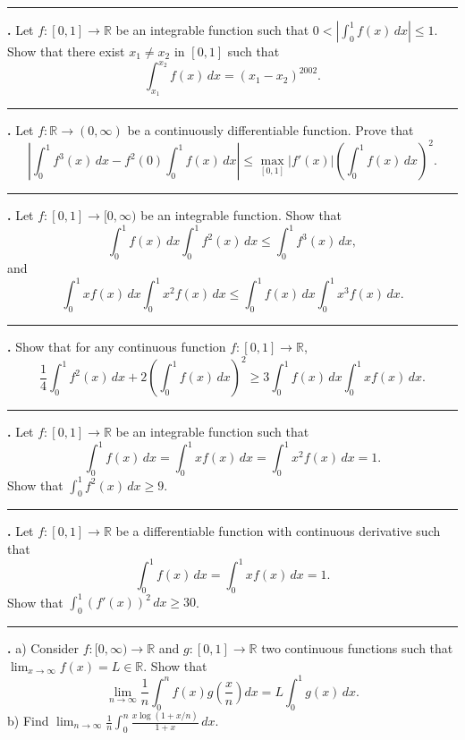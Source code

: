 \documentclass[11pt]{article}
\newcounter{probnum}
\newenvironment{problembox}{\par\noindent\rule{\linewidth}{0.5pt}\vspace{5pt}\par}{\vspace{2pt}}
\begin{document}
\begin{problembox}
\textbf{\theprobnum.} Let $f : [0,1] \to \mathbb{R}$ be an integrable function such that $0 < \left|\displaystyle\int_0^1 f(x)\,dx\right| \le 1$. Show that there exist $x_1 \ne x_2$ in $[0,1]$ such that
\[
\int_{x_1}^{x_2} f(x)\,dx = (x_1-x_2)^{2002}.
\]
\end{problembox}

\begin{problembox}
\textbf{\theprobnum.} Let $f : \mathbb{R} \to (0,\infty)$ be a continuously differentiable function. Prove that
\[
\left|\int_0^1 f^3(x)\,dx - f^2(0) \int_0^1 f(x)\,dx\right| \le \max_{[0,1]} |f'(x)| \left(\int_0^1 f(x)\,dx\right)^2.
\]
\end{problembox}

\begin{problembox}
\textbf{\theprobnum.} Let $f : [0,1] \to [0,\infty)$ be an integrable function. Show that
\[
\int_0^1 f(x)\,dx \int_0^1 f^2(x)\,dx \le \int_0^1 f^3(x)\,dx,
\]
and
\[
\int_0^1 x f(x)\,dx \int_0^1 x^2 f(x)\,dx \le \int_0^1 f(x)\,dx \int_0^1 x^3 f(x)\,dx.
\]
\end{problembox}

\begin{problembox}
\textbf{\theprobnum.} Show that for any continuous function $f : [0,1] \to \mathbb{R}$,
\[
\frac{1}{4} \int_0^1 f^2(x)\,dx + 2 \left(\int_0^1 f(x)\,dx\right)^2 \ge 3 \int_0^1 f(x)\,dx \int_0^1 x f(x)\,dx.
\]
\end{problembox}

\begin{problembox}
\textbf{\theprobnum.} Let $f : [0,1] \to \mathbb{R}$ be an integrable function such that
\[
\int_0^1 f(x)\,dx = \int_0^1 x f(x)\,dx = \int_0^1 x^2 f(x)\,dx = 1.
\]
Show that $\displaystyle\int_0^1 f^2(x)\,dx \ge 9$.
\end{problembox}

\begin{problembox}
\textbf{\theprobnum.} Let $f : [0,1] \to \mathbb{R}$ be a differentiable function with continuous derivative such that
\[
\int_0^1 f(x)\,dx = \int_0^1 x f(x)\,dx = 1.
\]
Show that $\displaystyle\int_0^1 (f'(x))^2\,dx \ge 30$.
\end{problembox}

\begin{problembox}
\textbf{\theprobnum.} a) Consider $f : [0,\infty) \to \mathbb{R}$ and $g : [0,1] \to \mathbb{R}$ two continuous functions such that $\displaystyle\lim_{x \to \infty} f(x) = L \in \mathbb{R}$. Show that
\[
\lim_{n \to \infty} \frac{1}{n} \int_0^n f(x) g\!\left(\frac{x}{n}\right) dx = L \int_0^1 g(x)\,dx.
\]
b) Find $\displaystyle\lim_{n \to \infty} \frac{1}{n} \int_0^n \frac{x \log(1+x/n)}{1+x}\,dx$.
\end{problembox}
\end{document}
